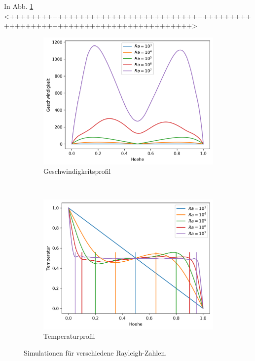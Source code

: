 \documentclass[12pt,a4paper,titlepage,headinclude]{scrartcl}
\numberwithin{equation}{subsection}
\begin{document}
In Abb. \ref{fig:v_num} <++++++++++++++++++++++++++++++++++++++++++++++++++++++++++++++++++++++++++++++++>
\begin{figure}[!ht]
	\centering
    \begin{subfigure}[t]{0.49\textwidth}
        \centering
	\includegraphics[width=0.9\linewidth]{V}
        \caption{Geschwindigkeitsprofil}
	\label{fig:v_num}
    \end{subfigure}%
    ~ 
    \begin{subfigure}[t]{0.49\textwidth}
        \centering
	\includegraphics[width=0.9\linewidth]{T}
        \caption{Temperaturprofil}
	\label{fig:t_num}
    \end{subfigure}
    \caption{Simulationen für verschiedene Rayleigh-Zahlen.}
\end{figure}
\end{document}
